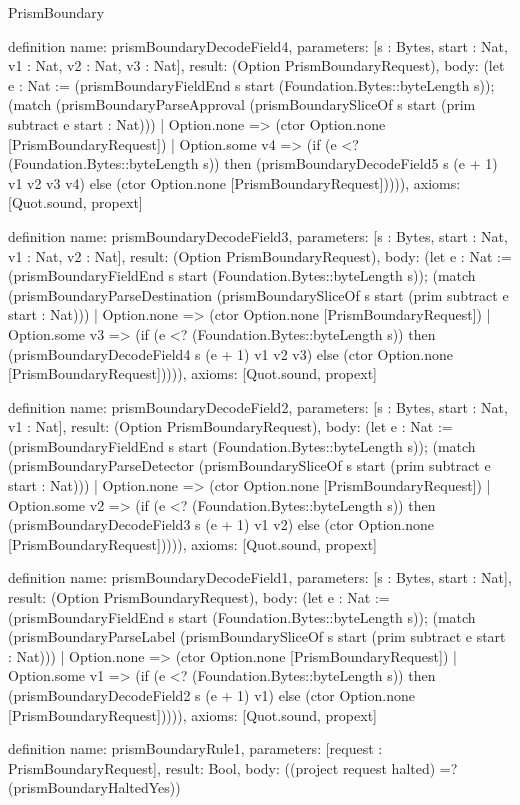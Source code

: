 \begin{lexlean}{PrismBoundary}
\begin{semanticmodule}
definition{
  name: prismBoundaryDecodeField4,
  parameters: [s : Bytes, start : Nat, v1 : Nat, v2 : Nat, v3 : Nat],
  result: (Option PrismBoundaryRequest),
  body: (let e : Nat := (prismBoundaryFieldEnd s start (Foundation.Bytes::byteLength s)); (match (prismBoundaryParseApproval (prismBoundarySliceOf s start (prim subtract e start : Nat)))
    | Option.none => (ctor Option.none [PrismBoundaryRequest])
    | Option.some v4 => (if (e <? (Foundation.Bytes::byteLength s)) then (prismBoundaryDecodeField5 s (e + 1) v1 v2 v3 v4) else (ctor Option.none [PrismBoundaryRequest])))),
  axioms: [Quot.sound, propext]
}

definition{
  name: prismBoundaryDecodeField3,
  parameters: [s : Bytes, start : Nat, v1 : Nat, v2 : Nat],
  result: (Option PrismBoundaryRequest),
  body: (let e : Nat := (prismBoundaryFieldEnd s start (Foundation.Bytes::byteLength s)); (match (prismBoundaryParseDestination (prismBoundarySliceOf s start (prim subtract e start : Nat)))
    | Option.none => (ctor Option.none [PrismBoundaryRequest])
    | Option.some v3 => (if (e <? (Foundation.Bytes::byteLength s)) then (prismBoundaryDecodeField4 s (e + 1) v1 v2 v3) else (ctor Option.none [PrismBoundaryRequest])))),
  axioms: [Quot.sound, propext]
}

definition{
  name: prismBoundaryDecodeField2,
  parameters: [s : Bytes, start : Nat, v1 : Nat],
  result: (Option PrismBoundaryRequest),
  body: (let e : Nat := (prismBoundaryFieldEnd s start (Foundation.Bytes::byteLength s)); (match (prismBoundaryParseDetector (prismBoundarySliceOf s start (prim subtract e start : Nat)))
    | Option.none => (ctor Option.none [PrismBoundaryRequest])
    | Option.some v2 => (if (e <? (Foundation.Bytes::byteLength s)) then (prismBoundaryDecodeField3 s (e + 1) v1 v2) else (ctor Option.none [PrismBoundaryRequest])))),
  axioms: [Quot.sound, propext]
}

definition{
  name: prismBoundaryDecodeField1,
  parameters: [s : Bytes, start : Nat],
  result: (Option PrismBoundaryRequest),
  body: (let e : Nat := (prismBoundaryFieldEnd s start (Foundation.Bytes::byteLength s)); (match (prismBoundaryParseLabel (prismBoundarySliceOf s start (prim subtract e start : Nat)))
    | Option.none => (ctor Option.none [PrismBoundaryRequest])
    | Option.some v1 => (if (e <? (Foundation.Bytes::byteLength s)) then (prismBoundaryDecodeField2 s (e + 1) v1) else (ctor Option.none [PrismBoundaryRequest])))),
  axioms: [Quot.sound, propext]
}

definition{
  name: prismBoundaryRule1,
  parameters: [request : PrismBoundaryRequest],
  result: Bool,
  body: ((project request halted) =? (prismBoundaryHaltedYes))
}


\end{semanticmodule}
\end{lexlean}
